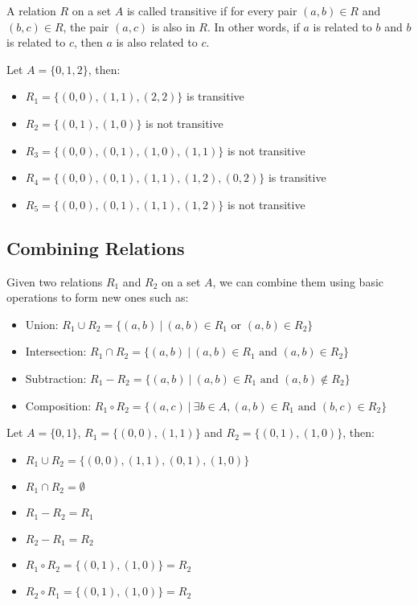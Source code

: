 \begin{definition}
    A relation $R$ on a set $A$ is called transitive if for every pair $(a, b) \in R$ and $(b, c) \in R$, the pair $(a, c)$ is also in $R$. In other words, if $a$ is related to $b$ and $b$ is related to $c$, then $a$ is also related to $c$.
\end{definition}
\begin{eg}
    Let $A = \{0,1,2\}$, then:
    \begin{itemize}[itemsep=1pt,label=$\circ$]
        \item $R_1 = \{(0,0), (1,1), (2,2)\}$ is transitive
        \item $R_2 = \{(0,1), (1,0)\}$ is not transitive
        \item $R_3 = \{(0,0), (0,1), (1,0), (1,1)\}$ is not transitive
        \item $R_4 = \{(0,0), (0,1), (1,1), (1,2), (0,2)\}$ is transitive
        \item $R_5 = \{(0,0), (0,1), (1,1), (1,2)\}$ is not transitive
    \end{itemize}
\end{eg}

\subsection{Combining Relations}
\begin{definition}
    Given two relations $R_1$ and $R_2$ on a set $A$, we can combine them using basic operations to form new ones such as:
    \begin{itemize}[itemsep=1pt,label=$\circ$]
        \item Union: $R_1 \cup R_2 = \{(a,b) \ | \ (a,b) \in R_1 \text{ or } (a,b) \in R_2\}$
        \item Intersection: $R_1 \cap R_2 = \{(a,b) \ | \ (a,b) \in R_1 \text{ and } (a,b) \in R_2\}$
        \item Subtraction: $R_1 - R_2 = \{(a,b) \ | \ (a,b) \in R_1 \text{ and } (a,b) \notin R_2\}$
        \item Composition: $R_1 \circ R_2 = \{(a,c) \ | \ \exists b \in A, (a,b) \in R_1 \text{ and } (b,c) \in R_2\}$
    \end{itemize}
\end{definition}
\begin{eg}
    Let $A = \{0,1\}$, $R_1 = \{(0,0), (1,1)\}$ and $R_2 = \{(0,1), (1,0)\}$, then:
    \begin{itemize}[itemsep=1pt,label=$\circ$]
        \item $R_1 \cup R_2 = \{(0,0), (1,1), (0,1), (1,0)\}$
        \item $R_1 \cap R_2 = \emptyset$
        \item $R_1 - R_2 = R_1$
        \item $R_2 - R_1 = R_2$
        \item $R_1 \circ R_2 = \{(0,1), (1,0)\} = R_2$
        \item $R_2 \circ R_1 = \{(0,1), (1,0)\} = R_2$
    \end{itemize}
\end{eg}

